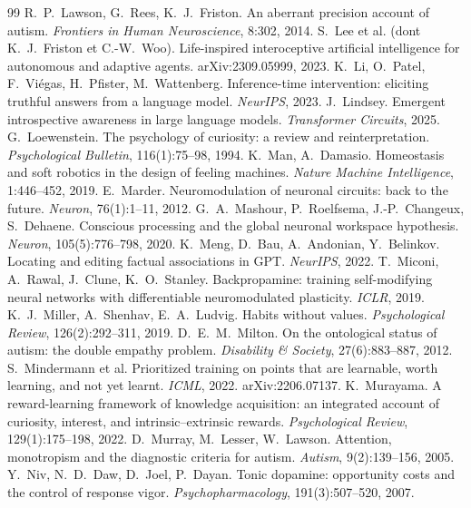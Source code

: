 \documentclass[11pt,a4paper]{article}
\begin{document}
\begin{thebibliography}{99}
 R.~P.~Lawson, G.~Rees, K.~J.~Friston. An aberrant precision account of autism. \emph{Frontiers in Human Neuroscience}, 8:302, 2014.
 S.~Lee et al. (dont K.~J.~Friston et C.-W.~Woo). Life-inspired interoceptive artificial intelligence for autonomous and adaptive agents. arXiv:2309.05999, 2023.
 K.~Li, O.~Patel, F.~Viégas, H.~Pfister, M.~Wattenberg. Inference-time intervention: eliciting truthful answers from a language model. \emph{NeurIPS}, 2023.
 J.~Lindsey. Emergent introspective awareness in large language models. \emph{Transformer Circuits}, 2025.
 G.~Loewenstein. The psychology of curiosity: a review and reinterpretation. \emph{Psychological Bulletin}, 116(1):75--98, 1994.
 K.~Man, A.~Damasio. Homeostasis and soft robotics in the design of feeling machines. \emph{Nature Machine Intelligence}, 1:446--452, 2019.
 E.~Marder. Neuromodulation of neuronal circuits: back to the future. \emph{Neuron}, 76(1):1--11, 2012.
 G.~A.~Mashour, P.~Roelfsema, J.-P.~Changeux, S.~Dehaene. Conscious processing and the global neuronal workspace hypothesis. \emph{Neuron}, 105(5):776--798, 2020.
 K.~Meng, D.~Bau, A.~Andonian, Y.~Belinkov. Locating and editing factual associations in GPT. \emph{NeurIPS}, 2022.
 T.~Miconi, A.~Rawal, J.~Clune, K.~O.~Stanley. Backpropamine: training self-modifying neural networks with differentiable neuromodulated plasticity. \emph{ICLR}, 2019.
 K.~J.~Miller, A.~Shenhav, E.~A.~Ludvig. Habits without values. \emph{Psychological Review}, 126(2):292--311, 2019.
 D.~E.~M.~Milton. On the ontological status of autism: the \og double empathy problem\fg{}. \emph{Disability \& Society}, 27(6):883--887, 2012.
 S.~Mindermann et al. Prioritized training on points that are learnable, worth learning, and not yet learnt. \emph{ICML}, 2022. arXiv:2206.07137.
 K.~Murayama. A reward-learning framework of knowledge acquisition: an integrated account of curiosity, interest, and intrinsic--extrinsic rewards. \emph{Psychological Review}, 129(1):175--198, 2022.
 D.~Murray, M.~Lesser, W.~Lawson. Attention, monotropism and the diagnostic criteria for autism. \emph{Autism}, 9(2):139--156, 2005.
 Y.~Niv, N.~D.~Daw, D.~Joel, P.~Dayan. Tonic dopamine: opportunity costs and the control of response vigor. \emph{Psychopharmacology}, 191(3):507--520, 2007.

\end{thebibliography}
\end{document}

